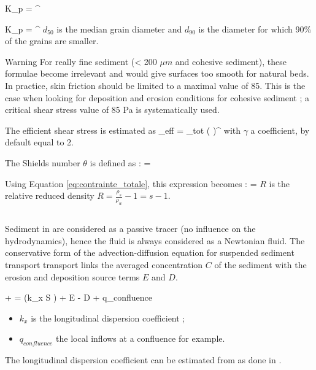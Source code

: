 \bequ
	K_p = ^
	\label{eq:strickler_kp}
\eequ

\bequ
	K_p = ^
	\label{eq:MPM_kp}
\eequ
$d_{50}$ is the median grain diameter and $d_{90}$ is the diameter for which 90\% of the grains are smaller.

\begin{WarningBlock}{Warning}
	For really fine sediment (< 200 $\mu m$ and cohesive sediment), these formulae become irrelevant and would give surfaces too smooth for natural beds. 
	In practice, skin friction should be limited to a maximal value of 85.
	This is the case when looking for deposition and erosion conditions for cohesive sediment ; a critical shear stress value of 85 Pa is systematically used.
\end{WarningBlock}

The efficient shear stress is estimated as 
\bequ
	\tau_{eff} = \tau_{tot} \left(  \right)^\gamma
\eequ  
with $\gamma$ a coefficient, by default equal to 2.

The Shields number $\theta$ is defined as :
\bequ
	\theta = 
\eequ

Using Equation \ref{eq:contrainte_totale}, this expression becomes :
\bequ
	\theta = 
	\label{eq:shields}
\eequ
 $R$ is the relative reduced density $R=\frac{\rho_s}{\rho_w}-1 = s - 1$.

\subsection{\Csuspension}
Sediment in \Csuspension are considered as a passive tracer (no influence on the hydrodynamics), hence the fluid is always considered as a Newtonian fluid. 
The conservative form of the advection-diffusion equation for suspended sediment transport transport links the averaged concentration $C$ of the sediment with the erosion and deposition source terms $E$ and $D$.

\bequ
     + = \left (k_x S  \right) + E - D + q_{confluence}
\eequ

\begin{itemize}
	\item $k_x$ is the longitudinal dispersion coefficient ;
	\item $q_{confluence}$ the local inflows at a confluence for example.
\end{itemize}
The longitudinal dispersion coefficient can be estimated from \cite{Kas02} as done in \cite{Hau14}. 

